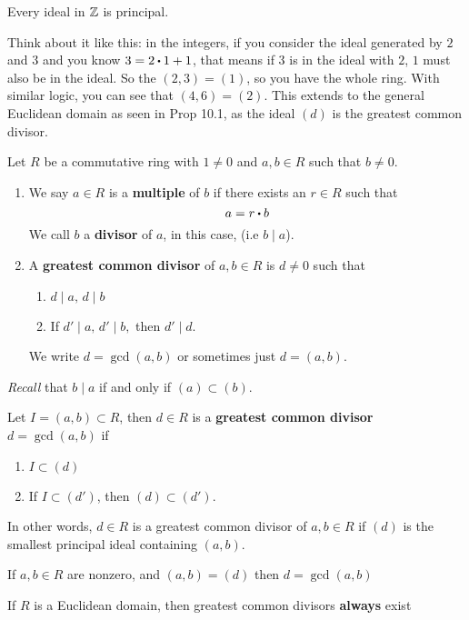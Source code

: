 \documentclass[../Main.tex]{subfiles}
\begin{document}
\begin{crl}[title= Ideals in \texorpdfstring{$\Z$}{TEXT} are principal]
	Every ideal in $\Z$ is principal.
\end{crl}
Think about it like this: in the integers, if you consider the ideal generated by $2$ and $3$ and you know $3=2\rdot 1+1$, that means if $3$ is in the ideal with $2$, $1$ must also be in the ideal. So the $(2,3)=(1)$, so you have the whole ring. With similar logic, you can see that $(4,6)=(2)$. This extends to the general Euclidean domain as seen in Prop 10.1, as the ideal $(d)$ is the greatest common divisor.
\begin{dfn}[title = {Multiple, Divisor, GCD}]
	Let $R$ be a commutative ring with $1\ne 0$ and $a,b\in R$ such that $b\ne 0$.
	\begin{enumerate}[label=(\arabic*)]
		\item We say $a\in R$ is a \textbf{multiple} of $b$ if there exists an $r\in R$ such that
		\[a=r\rdot b\]
		We call $b$ a \textbf{divisor} of $a$, in this case, (i.e $b\mid a$).
		\item A \textbf{greatest common divisor} of $a,b\in R$ is $d\ne 0$ such that
		\begin{enumerate}[label=(\roman*)]
			\item $d\mid a, \, d\mid b$
			\item If $d'\mid a,\,  d'\mid b,$ then $d'\mid d$.
		\end{enumerate}
		We write $d=\gcd(a,b)$ or sometimes just $d=(a,b)$.
	\end{enumerate}
\end{dfn}
\textit{Recall} that $b\mid a$ if and only if $(a)\subset (b)$.
\begin{dfn}[title = Ideal GCD]
	Let $I = (a,b)\subset R$, then $d\in R$ is a \textbf{greatest common divisor} $d=\gcd(a,b)$ if
	\begin{enumerate}
		\item $I\subset (d)$
		\item If $I\subset (d')$, then $(d)\subset (d')$.
	\end{enumerate}
	In other words, $d\in R$ is a greatest common divisor of $a,b\in R$ if $(d)$ is the smallest principal ideal containing $(a,b)$.
\end{dfn}
\begin{prop}
	If $a,b\in R$ are nonzero, and $(a,b)=(d)$ then $d=\gcd(a,b)$
\end{prop}	
\begin{thm}[title = GCDs exist in Euclidean domains]
	If $R$ is a Euclidean domain, then greatest common divisors \textbf{always} exist
\end{thm}
\end{document}
